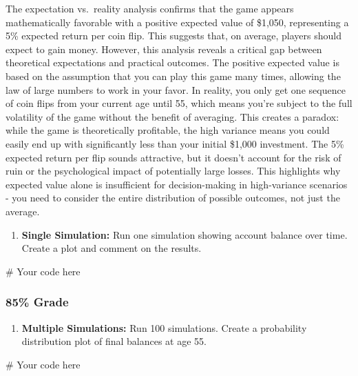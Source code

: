 \documentclass[
  letterpaper,
  DIV=11,
  numbers=noendperiod]{scrartcl}
\newenvironment{Shaded}{\begin{snugshade}}{\end{snugshade}}
\newcommand{\CommentTok}[1]{\textcolor[rgb]{0.37,0.37,0.37}{#1}}
\providecommand{\tightlist}{%
  \setlength{\itemsep}{0pt}\setlength{\parskip}{0pt}}
\begin{document}
The expectation vs.~reality analysis confirms that the game appears
mathematically favorable with a positive expected value of \$1,050,
representing a 5\% expected return per coin flip. This suggests that, on
average, players should expect to gain money. However, this analysis
reveals a critical gap between theoretical expectations and practical
outcomes. The positive expected value is based on the assumption that
you can play this game many times, allowing the law of large numbers to
work in your favor. In reality, you only get one sequence of coin flips
from your current age until 55, which means you're subject to the full
volatility of the game without the benefit of averaging. This creates a
paradox: while the game is theoretically profitable, the high variance
means you could easily end up with significantly less than your initial
\$1,000 investment. The 5\% expected return per flip sounds attractive,
but it doesn't account for the risk of ruin or the psychological impact
of potentially large losses. This highlights why expected value alone is
insufficient for decision-making in high-variance scenarios - you need
to consider the entire distribution of possible outcomes, not just the
average.

\begin{enumerate}
\def\labelenumi{\arabic{enumi}.}
\setcounter{enumi}{2}
\tightlist
\item
  \textbf{Single Simulation:} Run one simulation showing account balance
  over time. Create a plot and comment on the results.
\end{enumerate}

\begin{Shaded}
\begin{Highlighting}[]
\CommentTok{\# Your code here}
\end{Highlighting}
\end{Shaded}

\subsubsection{85\% Grade}\label{grade-1}

\begin{enumerate}
\def\labelenumi{\arabic{enumi}.}
\setcounter{enumi}{3}
\tightlist
\item
  \textbf{Multiple Simulations:} Run 100 simulations. Create a
  probability distribution plot of final balances at age 55.
\end{enumerate}

\begin{Shaded}
\begin{Highlighting}[]
\CommentTok{\# Your code here}
\end{Highlighting}
\end{Shaded}
\end{document}
